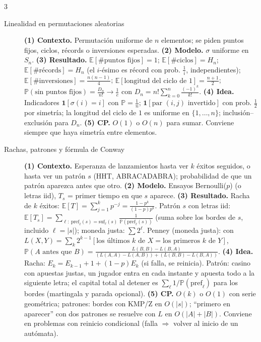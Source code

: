 \documentclass[8pt, spanish, mexico, letterpaper]{extarticle}
\newcommand{\E}{\mathbb{E}}
\newcommand{\Prob}{\mathbb{P}}
\newcommand{\<}{<}
\begin{document}
\begin{multicols*}{3}
\begin{description}
\item[Linealidad en permutaciones aleatorias] \textbf{(1) Contexto.} Permutaci\'on uniforme de $n$ elementos; se piden puntos fijos, ciclos, r\'ecords o inversiones esperadas. \textbf{(2) Modelo.} $\sigma$ uniforme en $S_n$. \textbf{(3) Resultado.} $\E[\#\text{puntos fijos}]=1$; $\E[\#\text{ciclos}]=H_n$; $\E[\#\text{r\'ecords}]=H_n$ (el $i$-\'esimo es r\'ecord con prob. $\frac1i$, independientes); $\E[\#\text{inversiones}]=\frac{n(n-1)}4$; $\E[\text{longitud del ciclo de }1]=\frac{n+1}2$; $\Prob(\text{sin puntos fijos})=\frac{D_n}{n!}\to\frac1e$ con $D_n=n!\sum_{k=0}^n\frac{(-1)^k}{k!}$. \textbf{(4) Idea.} Indicadores $\mathbf 1[\sigma(i){=}i]$ con $\Prob=\frac1n$; $\mathbf 1[\text{par }(i,j)\text{ invertido}]$ con prob. $\frac12$ por simetr\'ia; la longitud del ciclo de $1$ es uniforme en $\{1,\dots,n\}$; inclusi\'on--exclusi\'on para $D_n$. \textbf{(5) CP.} $O(1)$ o $O(n)$ para sumar. Conviene siempre que haya simetr\'ia entre elementos.

\item[Rachas, patrones y f\'ormula de Conway] \textbf{(1) Contexto.} Esperanza de lanzamientos hasta ver $k$ \'exitos seguidos, o hasta ver un patr\'on $s$ (HHT, ABRACADABRA); probabilidad de que un patr\'on aparezca antes que otro. \textbf{(2) Modelo.} Ensayos Bernoulli($p$) (o letras iid), $T_s$ = primer tiempo en que $s$ aparece. \textbf{(3) Resultado.} Racha de $k$ \'exitos: $\E[T]=\sum_{j=1}^k p^{-j}=\frac{1-p^k}{(1-p)p^k}$. Patr\'on $s$ con letras iid: $\E[T_s]=\sum_{\ell:\ \mathrm{pref}_\ell(s)=\mathrm{suf}_\ell(s)}\frac1{\Prob(\mathrm{pref}_\ell(s))}$ (suma sobre los bordes de $s$, incluido $\ell{=}|s|$); moneda justa: $\sum 2^\ell$. Penney (moneda justa): con $L(X,Y)=\sum_k2^{k-1}[\text{los \'ultimos }k\text{ de }X=\text{los primeros }k\text{ de }Y]$, $\Prob(A\text{ antes que }B)=\frac{L(B,B)-L(B,A)}{(L(A,A)-L(A,B))+(L(B,B)-L(B,A))}$. \textbf{(4) Idea.} Racha: $E_k=E_{k-1}+1+(1 - p)E_k$ (si falla, se reinicia). Patr\'on: casino con apuestas justas, un jugador entra en cada instante y apuesta todo a la siguiente letra; el capital total al detener es $\sum_\ell1/\Prob(\mathrm{pref}_\ell)$ para los bordes (martingala y parada opcional). \textbf{(5) CP.} $O(k)$ o $O(1)$ con serie geom\'etrica; patrones: bordes con KMP/Z en $O(|s|)$; ``primero en aparecer'' con dos patrones se resuelve con $L$ en $O(|A|+|B|)$. Conviene en problemas con reinicio condicional (falla $\Rightarrow$ volver al inicio de un autómata).


\end{description}
\end{multicols*}
\end{document}
